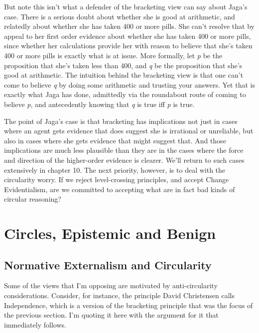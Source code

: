 But note this isn't what a defender of the bracketing view can say about \gls{Jaga}'s case. There is a serious doubt about whether she is good at arithmetic, and relatedly about whether she has taken 400 or more pills. She can't resolve that by appeal to her first order evidence about whether she has taken 400 or more pills, since whether her calculations provide her with reason to believe that she's taken 400 or more pills is exactly what is at issue. More formally, let \emph{p} be the proposition that she's taken less than 400, and \emph{q} be the proposition that she's good at arithmetic. The intuition behind the bracketing view is that one can't come to believe \emph{q} by doing some arithmetic and trusting your answers. Yet that is exactly what \gls{Jaga} has done, admittedly via the roundabout route of coming to believe \emph{p}, and antecedently knowing that \emph{q} is true iff \emph{p} is true.

The point of \gls{Jaga}'s case is that bracketing has implications not just in cases where an agent gets evidence that does suggest she is irrational or unreliable, but also in cases where she gets evidence that might suggest that. And those implications are much less plausible than they are in the cases where the force and direction of the higher-order evidence is clearer. We'll return to such cases extensively in chapter 10. The next priority, however, is to deal with the circularity worry. If we reject level-crossing principles, and accept Change Evidentialism, are we committed to accepting what are in fact bad kinds of circular reasoning?

\chapter{Circles, Epistemic and Benign}
\label{circlesepistemicandbenign}

\section{Normative Externalism and Circularity}
\label{normativeexternalismandcircularity}

Some of the views that I'm opposing are motivated by anti-circularity considerations. Consider, for instance, the principle David Christensen calls Independence, which is a version of the bracketing principle that was the focus of the previous section. I'm quoting it here with the argument for it that immediately follows.

